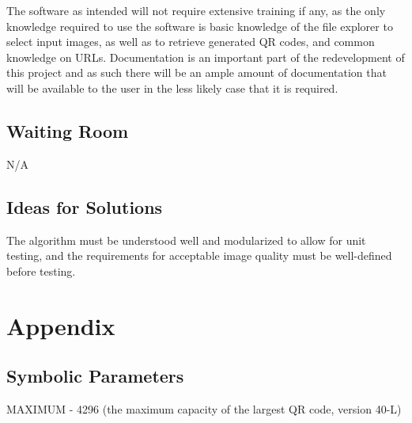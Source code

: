 \documentclass[12pt, titlepage]{article}
\begin{document}
	The software as intended will not require extensive training if any, as the 
	only knowledge required to use the software is basic knowledge of the file 
	explorer to select input images, as well as to retrieve generated QR codes, 
	and common knowledge on URLs. Documentation is an important part of the 
	redevelopment of this project and as such there will be an ample amount of 
	documentation that will be available to the user in the less likely case that it is required.

\subsection{Waiting Room}
	
	N/A
	
\subsection{Ideas for Solutions}

	The algorithm must be understood well and modularized to allow for unit 
	testing, and the requirements for acceptable image quality must be 
	well-defined before testing.





\newpage

\section{Appendix}


\subsection{Symbolic Parameters}

MAXIMUM - 4296 (the maximum capacity of the largest QR code, version 40-L)
\end{document}
